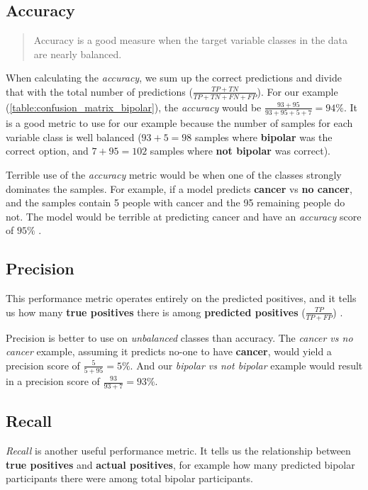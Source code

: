 \subsection{Accuracy}

\blockquote[\cite{ml_metrics}]{Accuracy is a good measure when the target variable classes in the data are nearly balanced.}

When calculating the \textit{accuracy}, we sum up the correct predictions and divide that with the total number of predictions 
($ \frac{TP + TN}{TP + TN + FN + FP} $).
For our example (\ref{table:confusion_matrix_bipolar}), the \textit{accuracy} would be 
$ \frac{93 + 95}{93 + 95 + 5 + 7} = 94\% $. 
It is a good metric to use for our example because the number of samples for each variable class is well balanced 
($ 93+5=98 $ samples where \textbf{bipolar} was the correct option, and $ 7+95=102 $ samples where \textbf{not bipolar} was correct).

Terrible use of the \textit{accuracy} metric would be when one of the classes strongly dominates the samples. 
For example, if a model predicts \textbf{cancer} vs \textbf{no cancer}, and the samples contain 5 people with cancer and 
the 95 remaining people do not. The model would be terrible at predicting cancer and have an \textit{accuracy} score of $ 95\% $ \cite{ml_metrics}.

\subsection{Precision} 

This performance metric operates entirely on the predicted positives, and it tells us how many \textbf{true positives} there is among 
\textbf{predicted positives} ($ \frac{TP}{TP + FP} $) \cite{ml_metrics}. 

Precision is better to use on \textit{unbalanced} classes than accuracy. The \textit{cancer vs no cancer} example, assuming it 
predicts no-one to have \textbf{cancer}, would yield a precision score of $ \frac{5}{5+95} = 5\% $. And our \textit{bipolar vs not bipolar} example
would result in a precision score of $ \frac{93}{93+7} = 93\% $.

\subsection{Recall}

\textit{Recall} is another useful performance metric. It tells us the relationship between \textbf{true positives} and \textbf{actual positives},
for example how many predicted bipolar participants there were among total bipolar participants.

